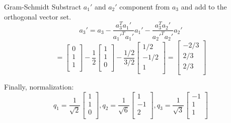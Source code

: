 \documentclass{beamer}
\begin{document}
\begin{frame}{Gram-Schmidt}
Substract $a_1'$ and $a_2'$ component from $a_3$ and add to the orthogonal vector set.
\begin{equation*}
    a_3'=a_3-\frac{a_3^Ta_1'}{a_1'^Ta_1'}a_1'-\frac{a_3^Ta_2'}{a_2'^Ta_2'}a_2'
\end{equation*}
\begin{equation*}
    =\left[ \begin{array}{c}
        0\\
        1\\
        1\\
    \end{array} \right] -\frac{1}{2}\left[ \begin{array}{c}
        1\\
        1\\
        0\\
    \end{array} \right] -\frac{1/2}{3/2}\left[ \begin{array}{c}
        1/2\\
        -1/2\\
        1\\
    \end{array} \right] =\left[ \begin{array}{c}
        -2/3\\
        2/3\\
        2/3\\
    \end{array} \right]
\end{equation*}

Finally, normalization:
\begin{equation*}
    q_1=\frac{1}{\sqrt{2}}\left[ \begin{array}{c}
        1\\
        1\\
        0\\
    \end{array} \right] , q_2=\frac{1}{\sqrt{6}}\left[ \begin{array}{c}
        1\\
        -1\\
        2\\
    \end{array} \right] , q_3=\frac{1}{\sqrt{3}}\left[ \begin{array}{c}
        -1\\
        1\\
        1\\
    \end{array} \right]
\end{equation*}
\end{frame}
\end{document}
